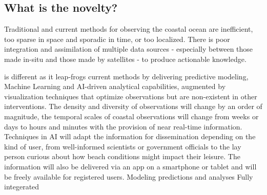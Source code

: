 



\vspace*{-0.2cm}
\subsection{What is the novelty?}

Traditional  and  current  methods  for  observing  the  coastal
ocean  are  inefficient,  too sparse in space and sporadic in time, or
too localized. There is poor integration and assimilation of multiple
data sources - especially between those made in-situ and those made by
satellites - to produce actionable knowledge.


\pro is different as it leap-frogs current methods by delivering
predictive modeling, Machine Learning and AI-driven analytical
capabilities, augmented by visualization techniques that optimize
observations but are non-existent in other interventions. The density
and diversity of observations will change by an order of magnitude,
the temporal scales of coastal observations will change from weeks or
days to hours and minutes with the provision of near real-time
information. Techniques in AI will adapt the information for
dissemination depending on the kind of user, from well-informed
scientists or government officials to the lay person curious about how
beach conditions might impact their leisure. The information will also
be delivered via an app on a smartphone or tablet and will be freely
available for registered users. \color{blue}
Modeling predictions and analyses Fully integerated \color{black}


